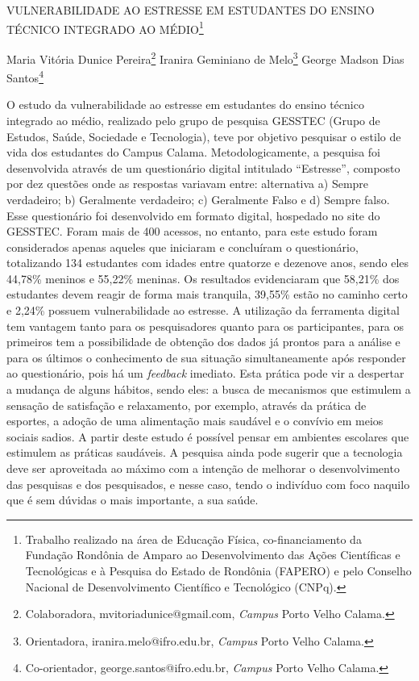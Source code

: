 \documentclass[article,12pt,onesidea,4paper,english,brazil]{abntex2}
\begin{document}
	
	
	\frenchspacing 
	
	\begin{center}
		\LARGE VULNERABILIDADE AO ESTRESSE EM ESTUDANTES DO ENSINO TÉCNICO INTEGRADO AO MÉDIO\footnote{Trabalho realizado na área de Educação Física, co-financiamento da Fundação Rondônia de Amparo ao
		Desenvolvimento das Ações Científicas e Tecnológicas e à Pesquisa do Estado de Rondônia (FAPERO) e pelo Conselho Nacional de Desenvolvimento Científico e Tecnológico (CNPq).}
		
		\normalsize
		Maria Vitória Dunice Pereira\footnote{Colaboradora, mvitoriadunice@gmail.com, \textit{Campus} Porto Velho Calama.} 
		Iranira Geminiano de Melo\footnote{Orientadora, iranira.melo@ifro.edu.br, \textit{Campus} Porto Velho Calama.} 
		George Madson Dias Santos\footnote{Co-orientador, george.santos@ifro.edu.br, \textit{Campus} Porto Velho Calama.} 
	\end{center}
	
	\noindent O estudo da vulnerabilidade ao estresse em estudantes do ensino técnico
	integrado ao médio, realizado pelo grupo de pesquisa GESSTEC (Grupo de
	Estudos, Saúde, Sociedade e Tecnologia), teve por objetivo pesquisar o estilo de
	vida dos estudantes do Campus Calama. Metodologicamente, a pesquisa foi
	desenvolvida através de um questionário digital intitulado “Estresse”, composto por
	dez questões onde as respostas variavam entre: alternativa a) Sempre verdadeiro;
	b) Geralmente verdadeiro; c) Geralmente Falso e d) Sempre falso. Esse questionário
	foi desenvolvido em formato digital, hospedado no site do GESSTEC. Foram mais
	de 400 acessos, no entanto, para este estudo foram considerados apenas aqueles
	que iniciaram e concluíram o questionário, totalizando 134 estudantes com idades
	entre quatorze e dezenove anos, sendo eles 44,78\% meninos e 55,22\% meninas.
	Os resultados evidenciaram que 58,21\% dos estudantes devem reagir de forma
	mais tranquila, 39,55\% estão no caminho certo e 2,24\% possuem vulnerabilidade ao
	estresse. A utilização da ferramenta digital tem vantagem tanto para os
	pesquisadores quanto para os participantes, para os primeiros tem a possibilidade
	de obtenção dos dados já prontos para a análise e para os últimos o conhecimento
	de sua situação simultaneamente após responder ao questionário, pois há um
	\textit{feedback} imediato. Esta prática pode vir a despertar a mudança de alguns hábitos,
	sendo eles: a busca de mecanismos que estimulem a sensação de satisfação e
	relaxamento, por exemplo, através da prática de esportes, a adoção de uma
	alimentação mais saudável e o convívio em meios sociais sadios. A partir deste
	estudo é possível pensar em ambientes escolares que estimulem as práticas
	saudáveis. A pesquisa ainda pode sugerir que a tecnologia deve ser aproveitada ao
	máximo com a intenção de melhorar o desenvolvimento das pesquisas e dos
	pesquisados, e nesse caso, tendo o indivíduo com foco naquilo que é sem dúvidas o
	mais importante, a sua saúde.	
	
\end{document}
